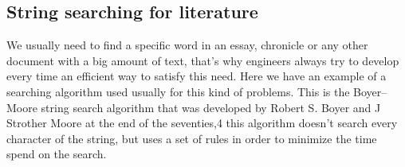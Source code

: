 \subsection{String searching for literature}
We usually need to find a specific word in an essay, chronicle or any other document with a big amount of text, that’s why engineers always try to develop every time an efficient way to satisfy this need. Here we have an example of a searching algorithm used usually for this kind of problems. 
This is the Boyer–Moore string search algorithm that was developed by Robert S. Boyer and J Strother Moore at the end of the seventies,4 this algorithm doesn’t search every character of the string, but uses a set of rules in order to minimize the time spend on the search.
